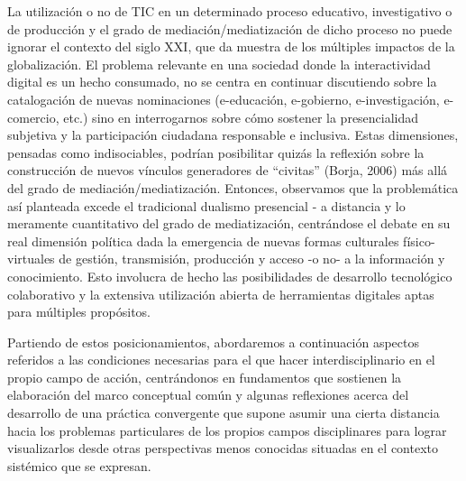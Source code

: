La utilización o no de TIC en un determinado proceso educativo, investigativo
o de producción y el grado de mediación/mediatización de dicho proceso no puede 
ignorar el contexto del siglo XXI, que da muestra de los múltiples impactos de
la globalización. El problema relevante en una sociedad donde la interactividad
digital es un hecho consumado, no se centra en continuar discutiendo sobre  la
catalogación  de  nuevas nominaciones (e-educación, e-gobierno, e-investigación,
e-comercio, etc.) sino en interrogarnos sobre cómo sostener la presencialidad
subjetiva y la participación ciudadana  responsable e inclusiva. Estas  
dimensiones, pensadas como indisociables, podrían posibilitar quizás la
reflexión sobre la construcción de nuevos vínculos generadores de “civitas”
(Borja, 2006) más allá del grado de mediación/mediatización. Entonces,
observamos que la problemática así planteada excede el tradicional dualismo
presencial - a distancia y lo meramente cuantitativo del grado de mediatización,
centrándose el debate en su real dimensión política dada la emergencia de nuevas
formas culturales físico-virtuales de gestión, transmisión, producción y acceso
-o no- a la información y conocimiento. Esto involucra de hecho las
posibilidades de desarrollo tecnológico colaborativo y la extensiva utilización
abierta de herramientas digitales aptas para múltiples propósitos.

Partiendo de estos posicionamientos, abordaremos a continuación aspectos   
referidos   a    las  condiciones    necesarias   para   el  que hacer
interdisciplinario  en  el  propio   campo    de   acción,  centrándonos   
en fundamentos que sostienen la elaboración del marco conceptual común y
algunas reflexiones acerca del desarrollo de una práctica convergente que
supone asumir una cierta distancia hacia los problemas particulares de los
propios    campos    disciplinares  para   lograr  visualizarlos  desde  otras
perspectivas menos conocidas situadas en el contexto sistémico que se
expresan.

